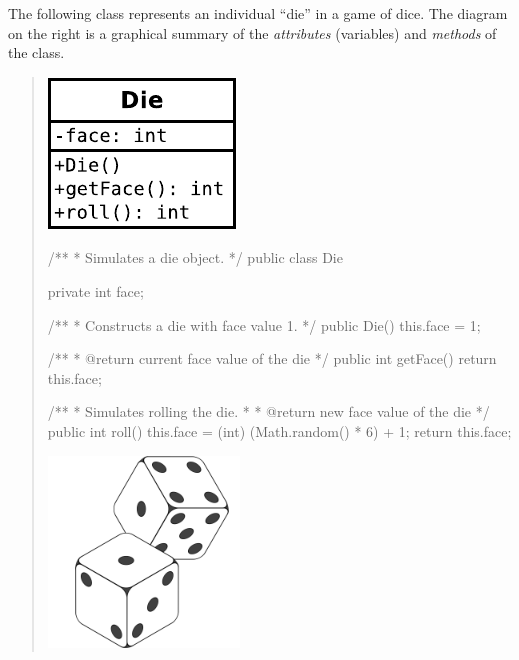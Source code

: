 
The following class represents an individual ``die'' in a game of dice.
The diagram on the right is a graphical summary of the \emph{attributes} (variables) and \emph{methods} of the class.

\vspace{1em}
\begin{quote}
\hfill\includegraphics{Die.pdf}
\vspace*{-84pt}

\begin{javalst}
/**
 * Simulates a die object.
 */
public class Die {

    private int face;

    /**
     * Constructs a die with face value 1.
     */
    public Die() {
        this.face = 1;
    }

    /**
     * @return current face value of the die
     */
    public int getFace() {
        return this.face;
    }

    /**
     * Simulates rolling the die.
     * 
     * @return new face value of the die
     */
    public int roll() {
        this.face = (int) (Math.random() * 6) + 1;
        return this.face;
    }

}
\end{javalst}

\vspace*{-72pt}
\hfill\includegraphics[width=2in]{dice.png}
\end{quote}


\newpage
{}


